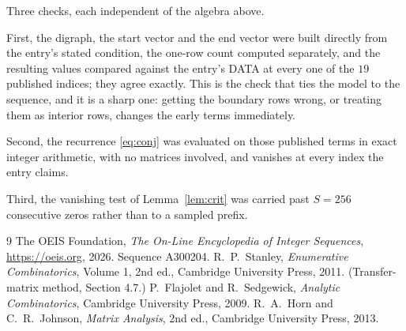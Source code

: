 \documentclass[11pt,a4paper]{article}
\theoremstyle{plain}
\theoremstyle{definition}
\begin{document}
Three checks, each independent of the algebra above.

First, the digraph, the start vector and the end vector were built directly from the
entry's stated condition, the one-row count computed separately, and the resulting values
compared against the entry's DATA at every one of the $19$ published indices; they
agree exactly. This is the check that ties the model to the sequence, and it is a sharp one:
getting the boundary rows wrong, or treating them as interior rows, changes the early terms
immediately.

Second, the recurrence \eqref{eq:conj} was evaluated on those published terms in exact
integer arithmetic, with no matrices involved, and vanishes at every index the entry claims.

Third, the vanishing test of Lemma~\ref{lem:crit} was carried past $S=256$ consecutive
zeros rather than to a sampled prefix.

\begin{thebibliography}{9}
 The OEIS Foundation, \emph{The On-Line Encyclopedia of Integer
Sequences}, \url{https://oeis.org}, 2026. Sequence A300204.
 R.~P.~Stanley, \emph{Enumerative Combinatorics}, Volume 1, 2nd ed.,
Cambridge University Press, 2011. (Transfer-matrix method, Section 4.7.)
 P.~Flajolet and R.~Sedgewick, \emph{Analytic Combinatorics}, Cambridge
University Press, 2009.
 R.~A.~Horn and C.~R.~Johnson, \emph{Matrix Analysis}, 2nd ed., Cambridge
University Press, 2013.
\end{thebibliography}
\end{document}
